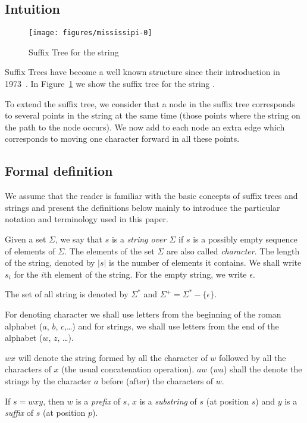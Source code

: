 \subsection{Intuition}

\begin{figure}
\texttt{[image: figures/mississipi-0]}
\caption{Suffix Tree for the string }%
\label{fig:mississipi-0}
\end{figure}

Suffix Trees have become a well known structure since their introduction in 1973~\cite{weiner}. In Figure~\ref{fig:mississipi-0} we show the suffix tree for the string .

To extend the suffix tree, we consider that a node in the suffix tree corresponds to several points in the string at the same time (those points where the string on the path to the node occurs). We now add to each node an extra edge which corresponds to moving one character forward in all these points.

\subsection{Formal definition}

We assume that the reader is familiar with the basic concepts of suffix trees and strings and present the definitions below mainly to introduce the particular notation and terminology used in this paper.

\begin{definition}
Given a set $\Sigma$, we say that $s$ is a \emph{string over $\Sigma$} if $s$ is a possibly empty sequence of elements of $\Sigma$. The elements of the set $\Sigma$ are also called \emph{character}. The length of the string, denoted by $|s|$ is the number of elements it contains. We shall write $s_i$ for the $i$th element of the string. For the empty string, we write $\epsilon$.

The set of all string is denoted by $\Sigma^*$ and $\Sigma^+=\Sigma^*-\{\epsilon\}$.
\end{definition}

For denoting character we shall use letters from the beginning of the roman alphabet ($a$, $b$, $c$,\ldots) and for strings, we shall use letters from the end of the alphabet ($w$, $z$, \ldots).

\begin{definition}
$wx$ will denote the string formed by all the character of $w$ followed by all the characters of $x$ (the usual concatenation operation). $aw$ ($wa$) shall the denote the strings by the character $a$ before (after) the characters of $w$.

If $s = wxy$, then $w$ is a \emph{prefix} of $s$, $x$ is a \emph{substring} of $s$ (at position $s$) and $y$ is a \emph{suffix} of $s$ (at position $p$).
\end{definition}

